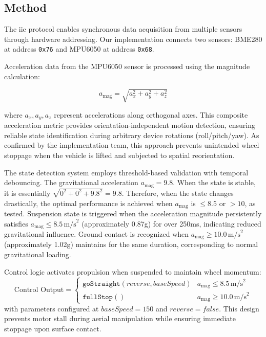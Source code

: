 \documentclass[../main]{subfiles}
\begin{document}
\subsection{Method}

The \gls{iic} protocol enables synchronous data acquisition from multiple sensors through hardware addressing. Our implementation connects two sensors: BME280 at address \texttt{0x76} and MPU6050 at address \texttt{0x68}.

Acceleration data from the MPU6050 sensor is processed using the magnitude calculation:

\begin{equation}
  a_{\text{mag}} = \sqrt{a_x^2 + a_y^2 + a_z^2}
  \label{eq:accel-mag}
\end{equation}

where \( a_x, a_y, a_z \) represent accelerations along orthogonal axes. This composite acceleration metric provides orientation-independent motion detection, ensuring reliable state identification during arbitrary device rotations (roll/pitch/yaw). As confirmed by the implementation team, this approach prevents unintended wheel stoppage when the vehicle is lifted and subjected to spatial reorientation.

The state detection system employs threshold-based validation with temporal debouncing. The gravitational acceleration $a_{\text{mag}} = 9.8$. When the state is stable, it is essentially $\sqrt{0^2 + 0^2 + 9.8^2} = 9.8$. Therefore, when the state changes drastically, the optimal performance is achieved when $a_{\text{mag}}$ is $\leq 8.5$ or $> 10$, as tested. Suspension state is triggered when the acceleration magnitude persistently satisfies \( a_{\text{mag}} \leq 8.5\, \text{m/s}^2 \) (approximately 0.87g) for over 250ms, indicating reduced gravitational influence. Ground contact is recognized when \( a_{\text{mag}} \geq 10.0\, \text{m/s}^2 \) (approximately 1.02g) maintains for the same duration, corresponding to normal gravitational loading.

Control logic activates propulsion when suspended to maintain wheel momentum:
\begin{equation}
  \text{Control Output} = 
  \begin{cases} 
    \texttt{goStraight}(\mathit{reverse}, \mathit{baseSpeed}) & a_{\text{mag}} \leq 8.5\, \text{m/s}^2 \\ 
    \texttt{fullStop}() & a_{\text{mag}} \geq 10.0\, \text{m/s}^2 
  \end{cases}
\end{equation}
with parameters configured at \(\mathit{baseSpeed} = 150\) and \(\mathit{reverse} = \mathit{false}\). This design prevents motor stall during aerial manipulation while ensuring immediate stoppage upon surface contact.
\end{document}
